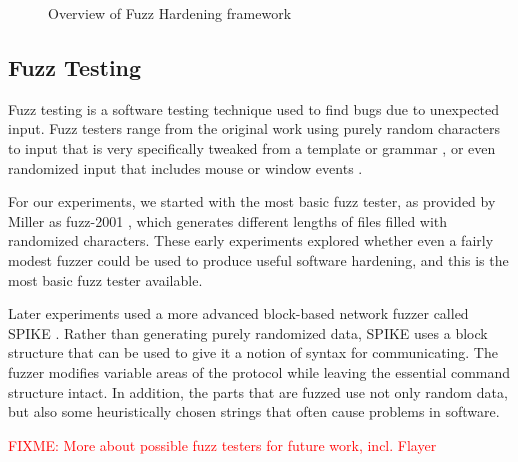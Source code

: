 \documentclass[conference]{IEEEtran}
\newcommand{\FIXME}[1]{\textcolor{red}{FIXME: #1}}
\begin{document}
\begin{figure*}[htb]
  
  \caption{Overview of Fuzz Hardening framework}
  \label{fig:overview}
\end{figure*}

\subsection{Fuzz Testing}

Fuzz testing is a software testing technique used to find bugs due to unexpected
input.  Fuzz testers range from the original work using purely random characters
\cite{Miller1990,Miller1995} to input that is very specifically tweaked from a
template or grammar \cite{modern,fuzz,papers}, or even randomized input that
includes mouse or window events \cite{Miller2006}.

For our experiments, we started with the most basic fuzz tester,
as provided by Miller as fuzz-2001 \cite{Millerfuzzwebsite}, which generates
different lengths of files filled with randomized characters.  These early
experiments explored whether even a fairly modest fuzzer could be used to
produce useful software hardening, and this is the most basic fuzz tester
available.

Later experiments used a more advanced block-based network fuzzer called SPIKE
\cite{SPIKE}.  Rather than generating purely randomized data, SPIKE uses a block
structure that can be used to give it a notion of syntax for communicating.
The fuzzer modifies variable areas of the protocol while leaving the essential
command structure intact.  In addition, the parts that are fuzzed use not only
random data, but also some heuristically chosen strings that often cause
problems in software. 

\FIXME{More about possible fuzz testers for future work, incl. Flayer}
\end{document}
